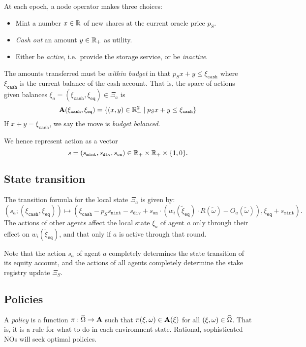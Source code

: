 At each epoch, a node operator makes three choices:
%
\begin{itemize}
  \item Mint a number $x\in\mathbb{R}$ of new shares at the current oracle price $p_S$.
  \item \emph{Cash out} an amount $y\in\mathbb{R}_+$ as utility.
  \item Either be \emph{active}, i.e.~provide the storage service, or be \emph{inactive}.
\end{itemize}
%
The amounts transferred must be \emph{within budget} in that $p_Sx+y\leq \xi_\mathtt{cash}$ where $\xi_\mathtt{cash}$ is the current balance of the cash account.
%
That is, the space of actions given balances $\xi_a=(\xi_\mathtt{cash},\xi_\mathtt{eq})\in\Xi_a$ is
\[
  \mathbf{A}(\xi_\mathtt{cash},\xi_\mathtt{eq}) = \{(x,y)\in \mathbb{R}_+^2 \mid p_Sx+y\leq \xi_\mathtt{cash} \}
\]
%
If $x+y = \xi_\mathtt{cash}$, we say the move is \emph{budget balanced}.

We hence represent action as a vector
\[
  s = (s_\mathtt{mint},s_\mathtt{div},s_\mathtt{on}) \in \mathbb{R}_+ \times \mathbb{R}_+ \times \{1,0\}.
\]

\subsection{State transition}
The transition formula for the local state $\Xi_a$ is given by:
\[
  (s_a; (\xi_\mathtt{cash},\xi_\mathtt{eq})) \mapsto
    (\xi_\mathtt{cash}-p_Ss_\mathtt{mint} - s_\mathtt{div} + s_\mathtt{on}\cdot (w_i(\tilde{\xi}_\mathtt{eq})\cdot R(\tilde\omega) - O_a(\tilde\omega)), \xi_\mathtt{eq} + s_\mathtt{mint}).
\]
The actions of other agents affect the local state $\xi_a$ of agent $a$ only through their effect on $w_i(\tilde{\xi}_\mathtt{eq})$, and that only if $a$ is active through that round.

Note that the action $s_a$ of agent $a$ completely determines the state transition of its equity account, and the actions of all agents completely determine the stake registry update $\Xi_S$.


\subsection{Policies}

A \emph{policy} is a function $\pi:\widehat{\Omega}\rightarrow\mathbf{A}$ such that $\pi(\xi,\omega)\in\mathbf{A}(\xi)$ for all $(\xi,\omega)\in\widehat{\Omega}$.
%
That is, it is a rule for what to do in each environment state.
%
Rational, sophisticated NOs will seek optimal policies.

